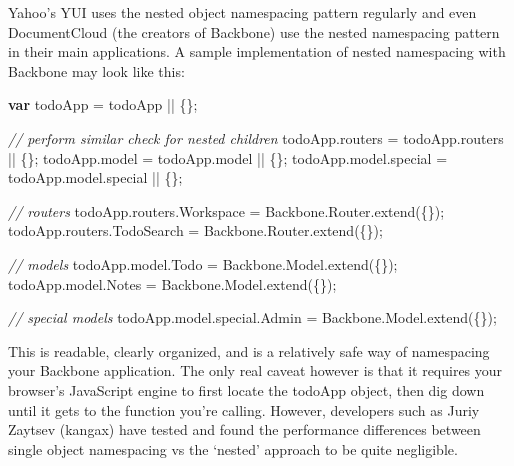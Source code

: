 \documentclass[9pt]{book}
\newenvironment{Shaded}{}{}
\newcommand{\KeywordTok}[1]{\textcolor[rgb]{0.00,0.44,0.13}{\textbf{{#1}}}}
\newcommand{\CommentTok}[1]{\textcolor[rgb]{0.38,0.63,0.69}{\textit{{#1}}}}
\newcommand{\OtherTok}[1]{\textcolor[rgb]{0.00,0.44,0.13}{{#1}}}
\newcommand{\FunctionTok}[1]{\textcolor[rgb]{0.02,0.16,0.49}{{#1}}}
\newcommand{\NormalTok}[1]{{#1}}
\begin{document}
Yahoo's YUI uses the nested object namespacing pattern regularly and
even DocumentCloud (the creators of Backbone) use the nested namespacing
pattern in their main applications. A sample implementation of nested
namespacing with Backbone may look like this:

\begin{Shaded}
\begin{Highlighting}[]
\KeywordTok{var} \NormalTok{todoApp =  todoApp || \{\};}

\CommentTok{// perform similar check for nested children}
\OtherTok{todoApp}\NormalTok{.}\FunctionTok{routers} \NormalTok{= }\OtherTok{todoApp}\NormalTok{.}\FunctionTok{routers} \NormalTok{|| \{\};}
\OtherTok{todoApp}\NormalTok{.}\FunctionTok{model} \NormalTok{= }\OtherTok{todoApp}\NormalTok{.}\FunctionTok{model} \NormalTok{|| \{\};}
\OtherTok{todoApp}\NormalTok{.}\OtherTok{model}\NormalTok{.}\FunctionTok{special} \NormalTok{= }\OtherTok{todoApp}\NormalTok{.}\OtherTok{model}\NormalTok{.}\FunctionTok{special} \NormalTok{|| \{\};}

\CommentTok{// routers}
\OtherTok{todoApp}\NormalTok{.}\OtherTok{routers}\NormalTok{.}\FunctionTok{Workspace}   \NormalTok{= }\OtherTok{Backbone}\NormalTok{.}\OtherTok{Router}\NormalTok{.}\FunctionTok{extend}\NormalTok{(\{\});}
\OtherTok{todoApp}\NormalTok{.}\OtherTok{routers}\NormalTok{.}\FunctionTok{TodoSearch} \NormalTok{= }\OtherTok{Backbone}\NormalTok{.}\OtherTok{Router}\NormalTok{.}\FunctionTok{extend}\NormalTok{(\{\});}

\CommentTok{// models}
\OtherTok{todoApp}\NormalTok{.}\OtherTok{model}\NormalTok{.}\FunctionTok{Todo}   \NormalTok{= }\OtherTok{Backbone}\NormalTok{.}\OtherTok{Model}\NormalTok{.}\FunctionTok{extend}\NormalTok{(\{\});}
\OtherTok{todoApp}\NormalTok{.}\OtherTok{model}\NormalTok{.}\FunctionTok{Notes} \NormalTok{= }\OtherTok{Backbone}\NormalTok{.}\OtherTok{Model}\NormalTok{.}\FunctionTok{extend}\NormalTok{(\{\});}

\CommentTok{// special models}
\OtherTok{todoApp}\NormalTok{.}\OtherTok{model}\NormalTok{.}\OtherTok{special}\NormalTok{.}\FunctionTok{Admin} \NormalTok{= }\OtherTok{Backbone}\NormalTok{.}\OtherTok{Model}\NormalTok{.}\FunctionTok{extend}\NormalTok{(\{\});}
\end{Highlighting}
\end{Shaded}

This is readable, clearly organized, and is a relatively safe way of
namespacing your Backbone application. The only real caveat however is
that it requires your browser's JavaScript engine to first locate the
todoApp object, then dig down until it gets to the function you're
calling. However, developers such as Juriy Zaytsev (kangax) have tested
and found the performance differences between single object namespacing
vs the `nested' approach to be quite negligible.
\end{document}
